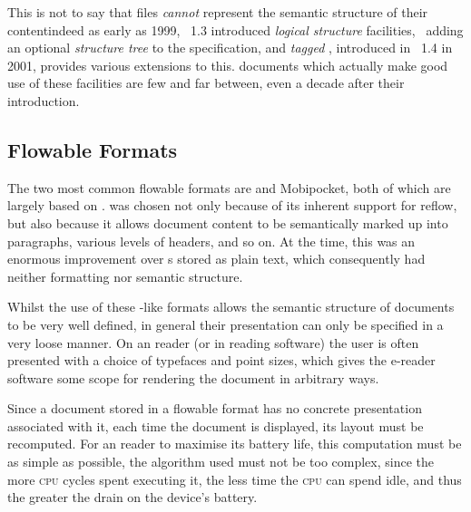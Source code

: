 This is not to say that \pdf{} files \emph{cannot} represent the semantic structure of their content\ed indeed as early as 1999, \pdf{}~1.3 introduced \emph{logical structure} facilities,~\cite{Adobe2001} adding an optional \emph{structure tree} to the \pdf{} specification, and \emph{tagged \pdf{}}, introduced in \pdf{}~1.4 in 2001, provides various extensions to this. \pdf{} documents which actually make good use of these facilities are few and far between, even a decade after their introduction.



\subsection{Flowable Formats}
\label{sec:flowableformats}

The two most common flowable \ebook{} formats are \epub{} and Mobipocket, both of which are largely based on \html{}. \html{} was chosen not only because of its inherent support for reflow, but also because it allows document content to be semantically marked up into paragraphs, various levels of headers, and so on. At the time, this was an enormous improvement over \ebook{}s stored as plain text, which consequently had neither formatting nor semantic structure. 

Whilst the use of these \html{}-like formats allows the semantic structure of documents to be very well defined, in general their presentation can only be specified in a very loose manner. On an \ebook{} reader (or in \ebook{} reading software) the user is often presented with a choice of typefaces and point sizes, which gives the e-reader software some scope for rendering the document in arbitrary ways.

Since a document stored in a flowable format has no concrete presentation associated with it, each time the document is displayed, its layout must be recomputed. For an \ebook{} reader to maximise its battery life, this computation must be as simple as possible, \ie{} the algorithm used must not be too complex, since the more \textsc{cpu} cycles spent executing it, the less time the \textsc{cpu} can spend idle, and thus the greater the drain on the device's battery.


